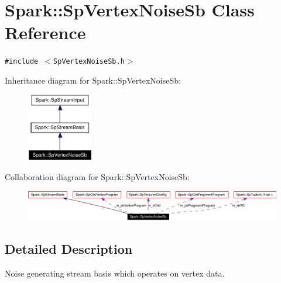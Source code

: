 \section{Spark::Sp\-Vertex\-Noise\-Sb Class Reference}
\label{classSpark_1_1SpVertexNoiseSb}
{\tt \#include $<$Sp\-Vertex\-Noise\-Sb.h$>$}

Inheritance diagram for Spark::Sp\-Vertex\-Noise\-Sb:\begin{figure}[H]
\begin{center}
\leavevmode
\includegraphics[width=82pt]{classSpark_1_1SpVertexNoiseSb__inherit__graph}
\end{center}
\end{figure}
Collaboration diagram for Spark::Sp\-Vertex\-Noise\-Sb:\begin{figure}[H]
\begin{center}
\leavevmode
\includegraphics[width=395pt]{classSpark_1_1SpVertexNoiseSb__coll__graph}
\end{center}
\end{figure}


\subsection{Detailed Description}
Noise generating stream basis which operates on vertex data. 

